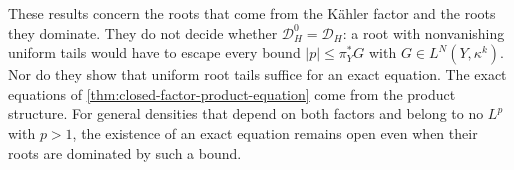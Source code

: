 These results concern the roots that come from the K\"ahler factor and the roots they dominate. They do not decide whether $\mathcal D_H^0=\mathcal D_H$: a root with nonvanishing uniform tails would have to escape every bound $|p|\leq\pi_Y^*G$ with $G\in L^N(Y,\kappa^k)$. Nor do they show that uniform root tails suffice for an exact equation. The exact equations of \cref{thm:closed-factor-product-equation} come from the product structure. For general densities that depend on both factors and belong to no $L^p$ with $p>1$, the existence of an exact equation remains open even when their roots are dominated by such a bound.
